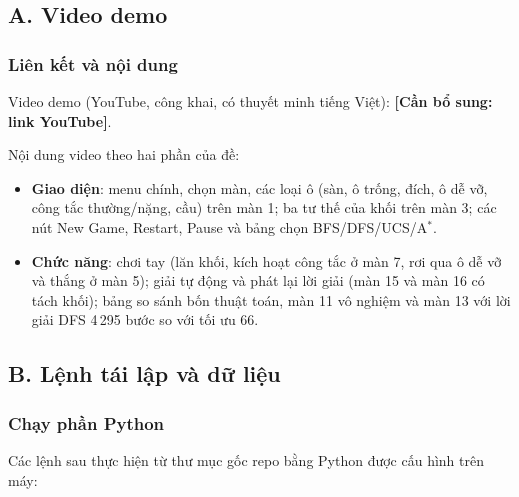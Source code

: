 \documentclass[a4paper]{article}
\newcommand{\canbosung}[1]{\textcolor{red!65!black}{\textbf{[Cần bổ sung: #1]}}}
\newcommand{\astar}{\texorpdfstring{A\ensuremath{^*}}{A*}}
\newcommand{\linkvideo}{\canbosung{link YouTube}}
\begin{document}
\subsection*{A. Video demo}
{}
\renewcommand{\thesubsubsection}{A.\arabic{subsubsection}}\setcounter{subsubsection}{0}
\renewcommand{\thetable}{A.\arabic{table}}\setcounter{table}{0}
\renewcommand{\theHsubsubsection}{appendixA.\arabic{subsubsection}}
\renewcommand{\theHtable}{appendixA.\arabic{table}}
\label{app:video}
\subsubsection{Liên kết và nội dung}
Video demo (YouTube, công khai, có thuyết minh tiếng Việt): \linkvideo.

Nội dung video theo hai phần của đề:
\begin{itemize}
\item \textbf{Giao diện}: menu chính, chọn màn, các loại ô (sàn, ô trống, đích, ô dễ vỡ, công tắc thường/nặng, cầu) trên màn 1; ba tư thế của khối trên màn 3; các nút New Game, Restart, Pause và bảng chọn BFS/DFS/UCS/\astar{}.
\item \textbf{Chức năng}: chơi tay (lăn khối, kích hoạt công tắc ở màn 7, rơi qua ô dễ vỡ và thắng ở màn 5); giải tự động và phát lại lời giải (màn 15 và màn 16 có tách khối); bảng so sánh bốn thuật toán, màn 11 vô nghiệm và màn 13 với lời giải DFS 4\,295 bước so với tối ưu 66.
\end{itemize}



\subsection*{B. Lệnh tái lập và dữ liệu}
{}
\renewcommand{\thesubsubsection}{B.\arabic{subsubsection}}\setcounter{subsubsection}{0}
\renewcommand{\thetable}{B.\arabic{table}}\setcounter{table}{0}
\renewcommand{\theHsubsubsection}{appendixB.\arabic{subsubsection}}
\renewcommand{\theHtable}{appendixB.\arabic{table}}
\subsubsection{Chạy phần Python}
Các lệnh sau thực hiện từ thư mục gốc repo bằng Python được cấu hình trên máy:\\
\end{document}
